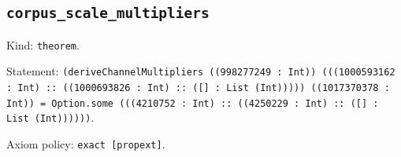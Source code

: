 \documentclass[11pt]{article}
\begin{document}
\subsection*{\texttt{corpus\_scale\_multipliers}}
\noindent Kind: \texttt{theorem}.\par
\noindent Statement: \texttt{(deriveChannelMultipliers ((998277249 : Int)) (((1000593162 : Int) :: ((1000693826 : Int) :: ([] : List (Int))))) ((1017370378 : Int)) = Option.some (((4210752 : Int) :: ((4250229 : Int) :: ([] : List (Int))))))}.\par
\noindent Axiom policy: \texttt{exact [propext]}.\par
\end{document}

